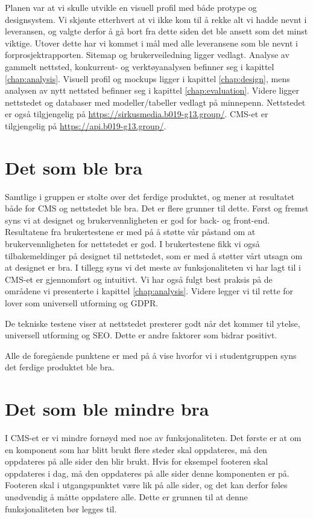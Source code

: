 Planen var at vi skulle utvikle en visuell profil med både protype og designsystem. Vi skjønte etterhvert at vi ikke kom til å rekke alt vi hadde nevnt i leveransen, og valgte derfor å gå bort fra dette siden det ble ansett som det minst viktige. Utover dette har vi kommet i mål med alle leveransene som ble nevnt i forprosjektrapporten. Sitemap og brukerveiledning ligger vedlagt. Analyse av gammelt nettsted, konkurrent- og verktøyanalysen befinner seg i kapittel \ref{chap:analysis}. Visuell profil og mockups ligger i kapittel \ref{chap:design}, mens analysen av nytt nettsted befinner seg i kapittel \ref{chap:evaluation}. Videre ligger nettstedet og databaser med modeller/tabeller vedlagt på minnepenn. Nettstedet er også tilgjengelig på \url{https://sirkusmedia.b019-g13.group/}. CMS-et er tilgjengelig på \url{https://api.b019-g13.group/}.

\section{Det som ble bra}
Samtlige i gruppen er stolte over det ferdige produktet, og mener at resultatet både for CMS og nettstedet ble bra. Det er flere grunner til dette. Først og fremst syns vi at designet og brukervennligheten er god for back- og front-end. Resultatene fra brukertestene er med på å støtte vår påstand om at brukervennligheten for nettstedet er god. I brukertestene fikk vi også tilbakemeldinger på designet til nettstedet, som er med å støtter vårt utsagn om at designet er bra. I tillegg syns vi det meste av funksjonaliteten vi har lagt til i CMS-et er gjennomført og intuitivt. Vi har også fulgt best praksis på de områdene vi presenterte i kapittel \ref{chap:analysis}. Videre legger vi til rette for lover som universell utforming og GDPR. 

De tekniske testene viser at nettstedet presterer godt når det kommer til ytelse, universell utforming og SEO. Dette er andre faktorer som bidrar positivt.

Alle de foregående punktene er med på å vise hvorfor vi i studentgruppen syns det ferdige produktet ble bra.

\section{Det som ble mindre bra}
I CMS-et er vi mindre fornøyd med noe av funksjonaliteten. Det første er at om en komponent som har blitt brukt flere steder skal oppdateres, må den oppdateres på alle sider den blir brukt. Hvis for eksempel footeren skal oppdateres i dag, må den oppdateres på alle sider denne komponenten er på. Footeren skal i utgangspunktet være lik på alle sider, og det kan derfor føles unødvendig å måtte oppdatere alle.  Dette er grunnen til at denne funksjonaliteten bør legges til.


